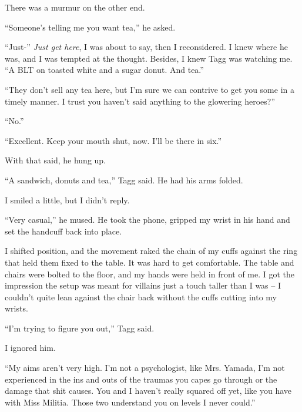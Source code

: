 There was a murmur on the other end.



``Someone's telling me you want tea,'' he asked.



``Just-'' \emph{Just get here}, I was about to say, then I reconsidered.  I knew where he was, and I was tempted at the thought.  Besides, I knew Tagg was watching me.  ``A BLT on toasted white and a sugar donut.  And tea.''



``They don't sell any tea here, but I'm sure we can contrive to get you some in a timely manner.  I trust you haven't said anything to the glowering heroes?''



``No.''



``Excellent.  Keep your mouth shut, now.  I'll be there in six.''



With that said, he hung up.



``A sandwich, donuts and tea,'' Tagg said.  He had his arms folded.



I smiled a little, but I didn't reply.



``Very casual,'' he mused.  He took the phone, gripped my wrist in his hand and set the handcuff back into place.



I shifted position, and the movement raked the chain of my cuffs against the ring that held them fixed to the table.  It was hard to get comfortable.  The table and chairs were bolted to the floor, and my hands were held in front of me.  I got the impression the setup was meant for villains just a touch taller than I was – I couldn't quite lean against the chair back without the cuffs cutting into my wrists.



``I'm trying to figure you out,'' Tagg said.



I ignored him.



``My aims aren't very high.  I'm not a psychologist, like Mrs. Yamada, I'm not experienced in the ins and outs of the traumas you capes go through or the damage that shit causes.  You and I haven't really squared off yet, like you have with Miss Militia.  Those two understand you on levels I never could.''



